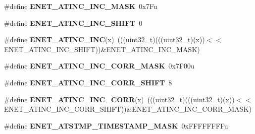\begin{DoxyCompactItemize}
\item 
\#define {\bfseries E\+N\+E\+T\+\_\+\+A\+T\+I\+N\+C\+\_\+\+I\+N\+C\+\_\+\+M\+A\+SK}~0x7\+Fu\hypertarget{group__ENET__Register__Masks_ga658c4082b327e6291ea190f5d2e7b8b6}{}\label{group__ENET__Register__Masks_ga658c4082b327e6291ea190f5d2e7b8b6}

\item 
\#define {\bfseries E\+N\+E\+T\+\_\+\+A\+T\+I\+N\+C\+\_\+\+I\+N\+C\+\_\+\+S\+H\+I\+FT}~0\hypertarget{group__ENET__Register__Masks_ga876ed9c5bafbfc5e251c600dc3b1af58}{}\label{group__ENET__Register__Masks_ga876ed9c5bafbfc5e251c600dc3b1af58}

\item 
\#define {\bfseries E\+N\+E\+T\+\_\+\+A\+T\+I\+N\+C\+\_\+\+I\+NC}(x)~(((uint32\+\_\+t)(((uint32\+\_\+t)(x))$<$$<$E\+N\+E\+T\+\_\+\+A\+T\+I\+N\+C\+\_\+\+I\+N\+C\+\_\+\+S\+H\+I\+FT))\&E\+N\+E\+T\+\_\+\+A\+T\+I\+N\+C\+\_\+\+I\+N\+C\+\_\+\+M\+A\+SK)\hypertarget{group__ENET__Register__Masks_ga8d15793d8ec37eb9f5c397303276da52}{}\label{group__ENET__Register__Masks_ga8d15793d8ec37eb9f5c397303276da52}

\item 
\#define {\bfseries E\+N\+E\+T\+\_\+\+A\+T\+I\+N\+C\+\_\+\+I\+N\+C\+\_\+\+C\+O\+R\+R\+\_\+\+M\+A\+SK}~0x7\+F00u\hypertarget{group__ENET__Register__Masks_gad06628842cadf9dd5423d8bc31c32745}{}\label{group__ENET__Register__Masks_gad06628842cadf9dd5423d8bc31c32745}

\item 
\#define {\bfseries E\+N\+E\+T\+\_\+\+A\+T\+I\+N\+C\+\_\+\+I\+N\+C\+\_\+\+C\+O\+R\+R\+\_\+\+S\+H\+I\+FT}~8\hypertarget{group__ENET__Register__Masks_ga804dc6e92567b82a7f104c250841d03d}{}\label{group__ENET__Register__Masks_ga804dc6e92567b82a7f104c250841d03d}

\item 
\#define {\bfseries E\+N\+E\+T\+\_\+\+A\+T\+I\+N\+C\+\_\+\+I\+N\+C\+\_\+\+C\+O\+RR}(x)~(((uint32\+\_\+t)(((uint32\+\_\+t)(x))$<$$<$E\+N\+E\+T\+\_\+\+A\+T\+I\+N\+C\+\_\+\+I\+N\+C\+\_\+\+C\+O\+R\+R\+\_\+\+S\+H\+I\+FT))\&E\+N\+E\+T\+\_\+\+A\+T\+I\+N\+C\+\_\+\+I\+N\+C\+\_\+\+C\+O\+R\+R\+\_\+\+M\+A\+SK)\hypertarget{group__ENET__Register__Masks_gab460295776472a46a57f683ee98f1928}{}\label{group__ENET__Register__Masks_gab460295776472a46a57f683ee98f1928}

\item 
\#define {\bfseries E\+N\+E\+T\+\_\+\+A\+T\+S\+T\+M\+P\+\_\+\+T\+I\+M\+E\+S\+T\+A\+M\+P\+\_\+\+M\+A\+SK}~0x\+F\+F\+F\+F\+F\+F\+F\+Fu\hypertarget{group__ENET__Register__Masks_gaed2e3431a926b017dc138606295ff909}{}\label{group__ENET__Register__Masks_gaed2e3431a926b017dc138606295ff909}


\end{DoxyCompactItemize}
